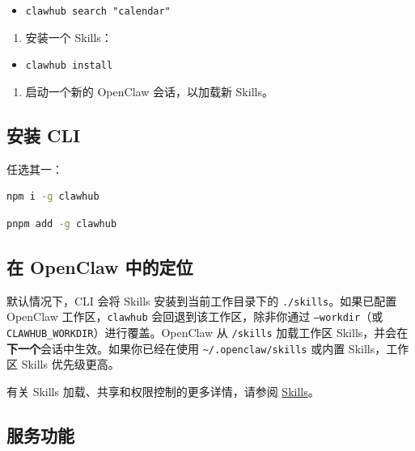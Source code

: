 \begin{itemize}
  \item \texttt{clawhub search "calendar"}
\end{itemize}

\begin{enumerate}
  \item 安装一个 Skills：
\end{enumerate}

\begin{itemize}
  \item \texttt{clawhub install }
\end{itemize}

\begin{enumerate}
  \item 启动一个新的 OpenClaw 会话，以加载新 Skills。
\end{enumerate}


\subsection{安装 CLI}


任选其一：

\begin{lstlisting}[language=bash]
npm i -g clawhub
\end{lstlisting}


\begin{lstlisting}[language=bash]
pnpm add -g clawhub
\end{lstlisting}


\subsection{在 OpenClaw 中的定位}


默认情况下，CLI 会将 Skills 安装到当前工作目录下的 \texttt{./skills}。如果已配置 OpenClaw 工作区，\texttt{clawhub} 会回退到该工作区，除非你通过 \texttt{--workdir}（或 \texttt{CLAWHUB\_WORKDIR}）进行覆盖。OpenClaw 从 \texttt{/skills} 加载工作区 Skills，并会在\textbf{下一个}会话中生效。如果你已经在使用 \texttt{\textasciitilde{}/.openclaw/skills} 或内置 Skills，工作区 Skills 优先级更高。

有关 Skills 加载、共享和权限控制的更多详情，请参阅
\href{/tools/skills}{Skills}。

\subsection{服务功能}



